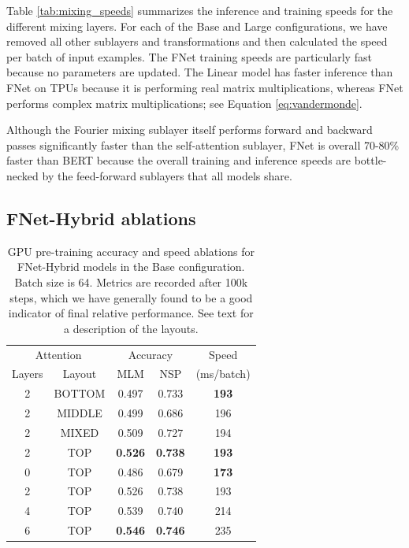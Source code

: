 Table \ref{tab:mixing_speeds} summarizes the inference and training speeds for the different mixing layers. For each of the Base and Large configurations, we have removed all other sublayers and transformations and then calculated the speed per batch of input examples. The FNet training speeds are particularly fast because no parameters are updated. The Linear model has faster inference than FNet on TPUs because it is performing real matrix multiplications, whereas FNet performs complex matrix multiplications; see Equation \eqref{eq:vandermonde}.

Although the Fourier mixing sublayer itself performs forward and backward passes significantly faster than the self-attention sublayer, FNet is overall 70-80\% faster than BERT because the overall training and inference speeds are bottle-necked by the feed-forward sublayers that all models share.

\subsection{FNet-Hybrid ablations}
\label{app:hybrid_ablations}

\begin{table}
    \caption{GPU pre-training accuracy and speed ablations for FNet-Hybrid models in the Base configuration. Batch size is 64. Metrics are recorded after 100k steps, which we have generally found to be a good indicator of final relative performance. See text for a description of the layouts.}
    \label{tab:hybrid_ablations}
    \setlength{\tabcolsep}{4pt}
    \centering
    \begin{tabular}{c c | c c | c}
        \hline
        \multicolumn{2}{c|}{Attention} & \multicolumn{2}{c|}{Accuracy} & Speed \\
        Layers & Layout & MLM & NSP & (ms/batch) \\ \hline \hline
        2 & BOTTOM & 0.497 & 0.733 & \textbf{193} \\
        2 & MIDDLE & 0.499 & 0.686 & 196 \\
        2 & MIXED & 0.509 &	0.727 &	194 \\
        2 & TOP & \textbf{0.526} &	\textbf{0.738} &	\textbf{193} \\ \hline
        0 & TOP & 0.486 &	0.679 &	\textbf{173} \\
        2 & TOP & 0.526 &	0.738 &	193 \\
        4 & TOP & 0.539 &	0.740 &	214 \\
        6 & TOP & \textbf{0.546} & \textbf{0.746}	& 235 \\ \hline
    \end{tabular}
\end{table}

